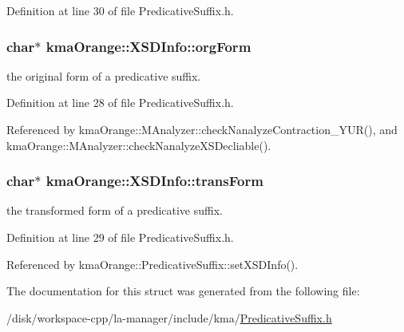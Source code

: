Definition at line 30 of file PredicativeSuffix.h.\hypertarget{structkmaOrange_1_1XSDInfo_912ec5d6c99a11aaede8b72f97d2ba62}{
\subsubsection[{orgForm}]{\setlength{\rightskip}{0pt plus 5cm}char$\ast$ {\bf kmaOrange::XSDInfo::orgForm}}}
\label{structkmaOrange_1_1XSDInfo_912ec5d6c99a11aaede8b72f97d2ba62}


the original form of a predicative suffix. 



Definition at line 28 of file PredicativeSuffix.h.

Referenced by kmaOrange::MAnalyzer::checkNanalyzeContraction\_\-YUR(), and kmaOrange::MAnalyzer::checkNanalyzeXSDecliable().\hypertarget{structkmaOrange_1_1XSDInfo_92de5b4d034c3cbb56c2ba6eb5d2eba9}{
\subsubsection[{transForm}]{\setlength{\rightskip}{0pt plus 5cm}char$\ast$ {\bf kmaOrange::XSDInfo::transForm}}}
\label{structkmaOrange_1_1XSDInfo_92de5b4d034c3cbb56c2ba6eb5d2eba9}


the transformed form of a predicative suffix. 



Definition at line 29 of file PredicativeSuffix.h.

Referenced by kmaOrange::PredicativeSuffix::setXSDInfo().

The documentation for this struct was generated from the following file:\begin{CompactItemize}
\item 
/disk/workspace-cpp/la-manager/include/kma/\hyperlink{PredicativeSuffix_8h}{PredicativeSuffix.h}\end{CompactItemize}
